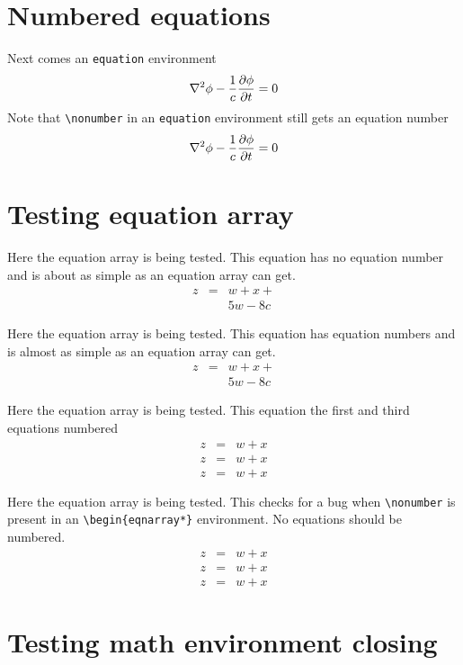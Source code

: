 \documentclass{article}
\begin{document}
\section{Numbered equations}
Next comes an \verb#equation# environment
\begin{equation}
\nabla^2 \phi -{1\over c} {\partial \phi\over \partial t}  = 0
\end{equation}
Note that \verb#\nonumber# in an \verb#equation# environment still gets
an equation number
\begin{equation}
\nabla^2 \phi -{1\over c} {\partial \phi\over \partial t}  = 0 \nonumber
\end{equation}

\section{Testing equation array}

Here the equation array is being tested.  This equation has no equation number
and is about as simple as an equation array can get.
\begin{eqnarray*}
z & = & w + x + \\
  &   & 5w - 8c 
\end{eqnarray*}

Here the equation array is being tested.  This equation has equation numbers
and is almost as simple as an equation array can get.
\begin{eqnarray}
z & = & w + x + \\
  &   & 5w - 8c 
\end{eqnarray}

Here the equation array is being tested.  This equation the first and third equations numbered
\begin{eqnarray}
z & = & w + x  \\
z & = & w + x \nonumber\\
z & = & w + x  
\end{eqnarray}

Here the equation array is being tested.  This checks for a bug when 
\verb#\nonumber# is present in an \verb#\begin{eqnarray*}# environment.  
No equations should be numbered.
\begin{eqnarray*}
z & = & w + x  \\
z & = & w + x \nonumber\\
z & = & w + x  
\end{eqnarray*}

\section{Testing math environment closing}
\end{document}
